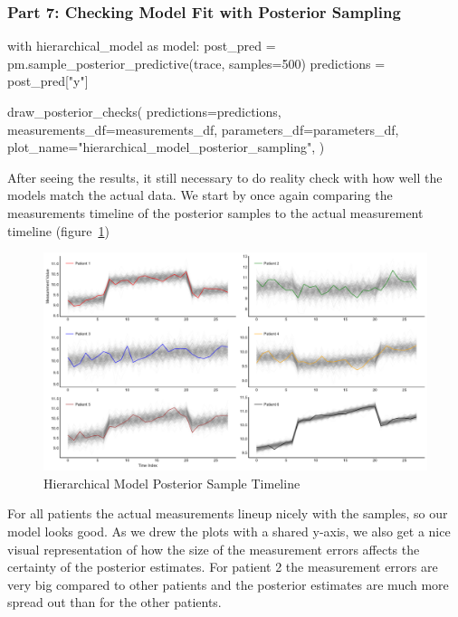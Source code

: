 \documentclass[12pt,a4paper,leqno]{report}
\theoremstyle{plain}
\theoremstyle{definition}
\theoremstyle{remark}
\begin{document}

\subsubsection*{Part 7: Checking Model Fit with Posterior Sampling}

\bigskip
\begin{pyverbatim}[][fontsize=\footnotesize]
with hierarchical_model as model:
    post_pred = pm.sample_posterior_predictive(trace, samples=500)
    predictions = post_pred["y"]

draw_posterior_checks(
    predictions=predictions,
    measurements_df=measurements_df,
    parameters_df=parameters_df,
    plot_name="hierarchical_model_posterior_sampling",
)
\end{pyverbatim}
\smallskip

After seeing the results, it still necessary to do reality check with how well the
models match the actual data. We start by once again comparing the measurements timeline
of the posterior samples to the actual measurement timeline (figure\ \ref{hierarhicalmodelposteriortimeline})

\bigskip
\begin{figure}[H]
    \caption{Hierarchical Model Posterior Sample Timeline}\label{hierarhicalmodelposteriortimeline}
    \bigskip
    \includegraphics[width=\textwidth,height=\textheight,keepaspectratio]{posterior_sample_timeline_hierarchical_model.pdf}
\end{figure}
\bigskip

For all patients the actual measurements lineup nicely with the samples, so our model
looks good. As we drew the plots with a shared y-axis, we also get a nice visual
representation of how the size of the measurement errors
affects the certainty of the posterior estimates. For patient 2 the measurement errors are
very big compared to other patients and the posterior estimates
are much more spread out than for the other patients.
\end{document}
